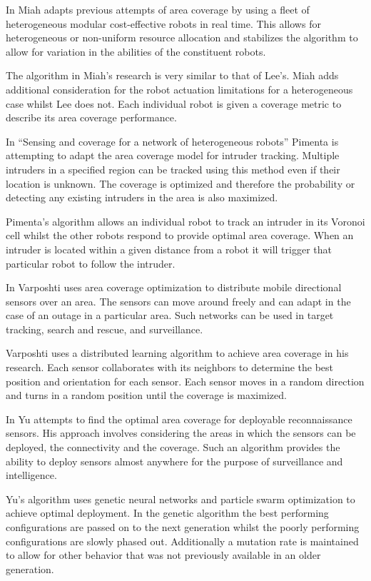 In \cite{Miah2018} Miah adapts previous attempts of area coverage by using a fleet of heterogeneous modular cost-effective robots in real time. This allows for heterogeneous or non-uniform resource allocation and stabilizes the algorithm to allow for variation in the abilities of the constituent robots. 

The algorithm in Miah’s research is very similar to that of Lee’s. Miah adds additional consideration for the robot actuation limitations for a heterogeneous case whilst Lee does not. Each individual robot is given a coverage metric to describe its area coverage performance. 

In “Sensing and coverage for a network of heterogeneous robots” \cite{Pimenta2009} Pimenta is attempting to adapt the area coverage model for intruder tracking. Multiple intruders in a specified region can be tracked using this method even if their location is unknown. The coverage is optimized and therefore the probability or detecting any existing intruders in the area is also maximized.  

Pimenta’s algorithm allows an individual robot to track an intruder in its Voronoi cell whilst the other robots respond to provide optimal area coverage. When an intruder is located within a given distance from a robot it will trigger that particular robot to follow the intruder. 

In \cite{Varposhti2016} Varposhti uses area coverage optimization to distribute mobile directional sensors over an area. The sensors can move around freely and can adapt in the case of an outage in a particular area. Such networks can be used in target tracking, search and rescue, and surveillance. 

Varposhti uses a distributed learning algorithm to achieve area coverage in his research. Each sensor collaborates with its neighbors to determine the best position and orientation for each sensor. Each sensor moves in a random direction and turns in a random position until the coverage is maximized. 

In \cite{Yu2018} Yu attempts to find the optimal area coverage for deployable reconnaissance sensors. His approach involves considering the areas in which the sensors can be deployed, the connectivity and the coverage. Such an algorithm provides the ability to deploy sensors almost anywhere for the purpose of surveillance and intelligence. 

Yu’s algorithm uses genetic neural networks and particle swarm optimization to achieve optimal deployment. In the genetic algorithm the best performing configurations are passed on to the next generation whilst the poorly performing configurations are slowly phased out. Additionally a mutation rate is maintained to allow for other behavior that was not previously available in an older generation. 

  


